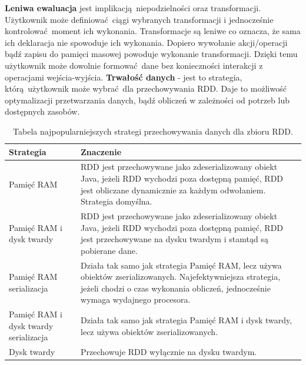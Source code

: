 \newline \textbf{Leniwa ewaluacja} jest implikacją niepodzielności oraz transformacji. Użytkownik może definiować ciągi wybranych transformacji i jednocześnie kontrolować moment ich wykonania. Transformacje są leniwe co oznacza, że sama ich deklaracja nie spowoduje ich wykonania. Dopiero wywołanie akcji/operacji bądź zapisu do pamięci masowej powoduje wykonanie transformacji. Dzięki temu użytkownik może dowolnie formować dane bez konieczności interakcji z operacjami wejścia-wyjścia.
\newline \textbf{Trwałość danych} - jest to strategia, którą użytkownik może wybrać dla przechowywania RDD. Daje to możliwość optymalizacji przetwarzania danych, bądź obliczeń w zależności od potrzeb lub dostępnych zasobów.  
\begin{table}[]
	\centering
	\caption{Tabela najpopularniejszych strategi przechowywania danych dla zbioru RDD.}	
	\label{RDD-strategy}
	\begin{tabular}{|l|p{6.5cm}|}
		\hline
		Strategia                             & Znaczenie                                                                                                                                                                                     \\ \hline
		Pamięć RAM                            & RDD jest przechowywane jako zdeserializowany obiekt Java, jeżeli RDD wychodzi poza dostępną pamięć, RDD jest obliczane dynamicznie za każdym odwołaniem. Strategia domyślna.                  \\ \hline
		Pamięć RAM i dysk twardy              & RDD jest przechowywane jako zdeserializowany obiekt Java, jeżeli RDD wychodzi poza dostępną pamięć, RDD jest przechowywane na dysku twardym i stamtąd są pobierane dane.                            \\ \hline
		Pamięć RAM serializacja               & Działa tak samo jak strategia Pamięć RAM, lecz używa obiektów zserializowanych. Najefektywniejsza strategia, jeżeli chodzi o czas wykonania obliczeń, jednocześnie wymaga wydajnego procesora. \\ \hline
		Pamięć RAM i dysk twardy serializacja & Działa tak samo jak strategia Pamięć RAM i dysk twardy, lecz używa obiektów zserializowanych.                                                                                                 \\ \hline
		Dysk twardy                           & Przechowuje RDD wyłącznie na dysku twardym.                                                                                                                                                   \\ \hline
	\end{tabular}
\end{table}
